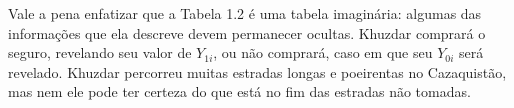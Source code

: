 \documentclass[a4paper,12pt]{article}[abntex2]
\begin{document}
Vale a pena enfatizar que a Tabela 1.2 é uma tabela imaginária: algumas das informações que ela descreve devem permanecer ocultas. Khuzdar comprará o seguro, revelando seu valor de \(Y_{1i}\), ou não comprará, caso em que seu \(Y_{0i}\) será revelado. Khuzdar percorreu muitas estradas longas e poeirentas no Cazaquistão, mas nem ele pode ter certeza do que está no fim das estradas não tomadas.
\end{document}
